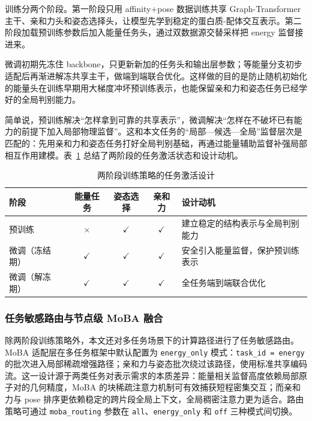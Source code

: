 训练分两个阶段。第一阶段只用 affinity+pose 数据训练共享 Graph-Transformer 主干、亲和力头和姿态选择头，让模型先学到稳定的蛋白质-配体交互表示。第二阶段加载预训练参数后加入能量任务头，通过双数据源交替采样把 energy 监督接进来。

微调初期先冻住 backbone，只更新新加的任务头和输出层参数；等能量分支初步适配后再渐进解冻共享主干，做端到端联合优化。这样做的目的是防止随机初始化的能量头在训练早期用大梯度冲坏预训练表示，也能保留亲和力和姿态任务已经学好的全局判别能力。

简单说，预训练解决“怎样拿到可靠的共享表示”，微调解决“怎样在不破坏已有能力的前提下加入局部物理监督”。这和本文任务的“局部—候选—全局”监督层次是匹配的：先用亲和力和姿态任务打好全局判别基础，再通过能量辅助监督补强局部相互作用建模。表~\ref{T.two_stage_summary} 总结了两阶段的任务激活状态和设计动机。

\begin{table}[hbt]
  \centering
  \caption{两阶段训练策略的任务激活设计}
  \label{T.two_stage_summary}
  \small
  \begin{tabular}{lcccp{5.5cm}}
    \toprule
    阶段 & 能量任务 & 姿态选择 & 亲和力 & 设计动机 \\
    \midrule
    预训练 & $\times$ & $\checkmark$ & $\checkmark$ & 建立稳定的结构表示与全局判别能力 \\
    微调（冻结期） & $\checkmark$ & $\checkmark$ & $\checkmark$ & 安全引入能量监督，保护预训练表示 \\
    微调（解冻期） & $\checkmark$ & $\checkmark$ & $\checkmark$ & 全任务端到端联合优化 \\
    \bottomrule
  \end{tabular}
\end{table}

\subsubsection{任务敏感路由与节点级 MoBA 融合}

除两阶段训练策略外，本文还对多任务场景下的计算路径进行了任务敏感路由。MoBA 适配层在多任务框架中默认配置为 \texttt{energy\_only} 模式：\texttt{task\_id = energy} 的批次进入局部稀疏增强路径；亲和力与姿态批次绕过该路径，使用标准共享编码流。这一设计源于两类任务对表示需求的本质差异：能量相关监督高度依赖局部原子对的几何精度，MoBA 的块稀疏注意力机制可有效捕获短程密集交互；而亲和力与 pose 排序更依赖稳定的跨片段全局上下文，全局稠密注意力更为适合\cite{lu2025moba,ying2021transformers}。路由策略可通过 \texttt{moba\_routing} 参数在 \texttt{all}、\texttt{energy\_only} 和 \texttt{off} 三种模式间切换。

